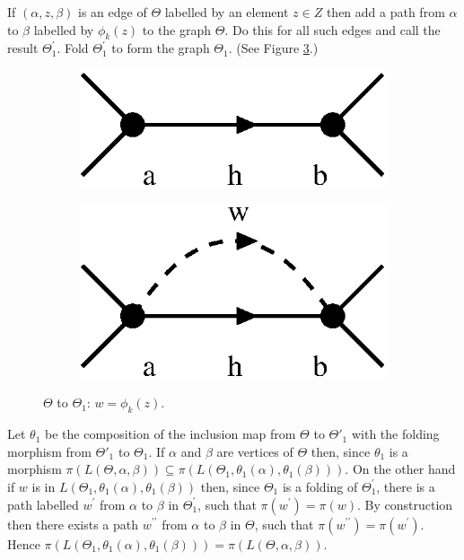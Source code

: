 \documentclass[a4paper,12pt]{article}
\renewcommand{\a}{\alpha }
\renewcommand{\b}{\beta }
\newcommand{\T}{\Theta }
\numberwithin{equation}{section}
\numberwithin{figure}{section}
\begin{document}
 If $(\a,z,\b)$ is an
edge of $\T$ labelled by an element $z\in Z$ then add a path from
$\a$ to $\b$ labelled by $\phi_k(z)$ to the graph $\T$. Do this
for all such edges and call the result
$\T_1^\prime$. Fold $\T_1^\prime$ to form the graph
$\T_1$. (See Figure \ref{fig:alg2-1}.)
\begin{figure}
\begin{center}
\psfrag{a}{$\a$}
\psfrag{b}{$\b$}
\begin{subfigure}[b]{.25\columnwidth}
\includegraphics[scale=.5]{alg2-1a.eps}
\label{fig:alg2-1a}
\end{subfigure}
\raisebox{3ex}{$\leadsto$}
\begin{subfigure}[b]{.25\columnwidth}
\psfrag{a}{$\a$}
\psfrag{b}{$\b$}
\includegraphics[scale=.5]{alg2-1b.eps}
\label{fig:alg2-1b}
\end{subfigure}
\end{center}
\caption{$\Theta$ to $\Theta_1$: $w=\phi_k(z)$.}\label{fig:alg2-1}
\end{figure}
Let $\theta_1$ be the composition of the inclusion map from 
$\Theta$ to $\Theta'_1$ with the folding morphism from $\Theta'_1$ to
$\Theta_1$. If $\a$ and $\b$ are vertices of $\Theta$ then,
since $\theta_1$ is a morphism
$\pi(L(\Theta, \a,\b))\subseteq \pi(L(\Theta_1,\theta_1(\a),\theta_1(\b)))$.
On the other hand if $w$ is in  $L(\Theta_1,\theta_1(\a),\theta_1(\b))$
then, since $\Theta_1$ is a folding of $\Theta_1^\prime$,
 there is a path labelled $w^\prime$ from $\a$ to $\b$ in $\Theta_1^\prime$,
such that $\pi(w^\prime)=\pi(w)$.
By construction then there exists  a path $w^{\prime\prime}$ from
$\a$ to $\b$ in $\Theta$, such that $\pi(w^{\prime\prime}) =
\pi(w^\prime)$. Hence $\pi(L(\Theta_1,\theta_1(\a),\theta_1(\b)))
= \pi(L(\Theta, \a,\b))$.  \\[1em]
\end{document}
